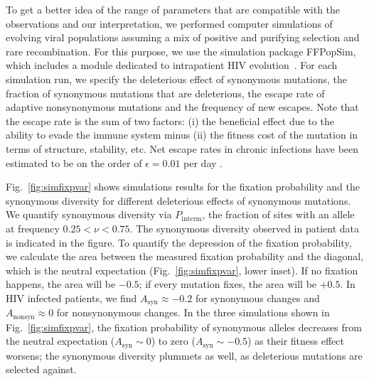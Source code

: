 \documentclass[rmp, twocolumn]{revtex4}
\newcommand{\FIG}[1]{Fig.~\ref{fig:#1}}
\begin{document}
To get a better idea of the range of parameters that are compatible with the
observations and our interpretation, we performed computer simulations of
evolving viral populations assuming a mix of positive and purifying selection
and rare recombination.  For this purpose, we use the simulation package
FFPopSim, which includes a module dedicated to intrapatient HIV
evolution~\citep{zanini_ffpopsim:_2012}. For each simulation run, we specify the
deleterious effect of synonymous mutations, the fraction of synonymous mutations
that are deleterious, the escape rate of adaptive nonsynonymous mutations and
the frequency of new escapes. Note that the escape rate is the sum of two
factors: (i) the beneficial effect due to the ability to evade the immune system
minus (ii) the fitness cost of the mutation in terms of structure, stability,
etc. Net escape rates in chronic infections have been estimated to be on the
order of $\epsilon = 0.01$ per day \citep{neher_recombination_2010,
Asquith:2006p28003}.

\FIG{simfixpvar} shows simulations results for the fixation probability and the
synonymous diversity for different deleterious effects of synonymous mutations.
We quantify synonymous diversity via $P_\text{interm}$, the fraction of sites
with an allele at frequency $0.25 < \nu < 0.75$. The synonymous diversity
observed in patient data is indicated in the figure.  To quantify the depression
of the fixation probability, we calculate the area between the measured fixation
probability and the diagonal, which is the neutral expectation
(\FIG{simfixpvar}, lower inset). If no fixation happens, the area will be
$-0.5$; if every mutation fixes, the area will be $+0.5$. In HIV infected
patients, we find $A_\text{syn} \approx -0.2$ for synonymous changes and
$A_\text{nonsyn} \approx 0$ for nonsynonymous changes. In the three simulations
shown in \FIG{simfixpvar}, the fixation probability of synonymous alleles
decreases from the neutral expectation ($A_\text{syn} \sim 0$) to zero
($A_\text{syn} \sim -0.5$) as their fitness effect worsens; the synonymous
diversity plummets as well, as deleterious mutations are selected against.
\end{document}
